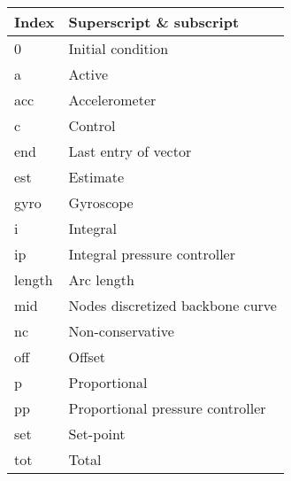 \begin{spacing}{0.9}
\begin{multicols}{2}
\begin{table}[H]
\begin{tabular}{p{2.5cm} p{3.4cm}}
    
    \end{tabular}
\end{table}


\begin{table}[H]
\centering
    \begin{tabular}{p{1.1cm} p{5.4cm}} \hline
    \textbf{Index}    &   \textbf{Superscript \& subscript}\\ \hline
    0     &  Initial condition \\
    a     &  Active \\
    acc    & Accelerometer \\
    c     & Control \\
    end   & Last entry of vector \\
    est   & Estimate \\
    gyro  & Gyroscope \\
    i     & Integral \\
    ip     & Integral pressure controller \\
    length & Arc length \\
    mid    & Nodes discretized backbone curve \\
    nc    & Non-conservative \\
    off   & Offset \\
    p    & Proportional \\
    pp    & Proportional pressure controller\\
    set   & Set-point \\
    tot    & Total \\ \hline
    \end{tabular}
\end{table}







\end{multicols}
\end{spacing}
